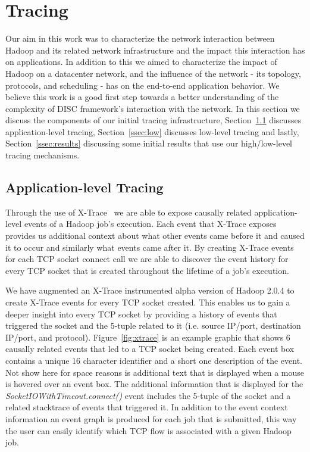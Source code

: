 \section{Tracing}
\label{sec:tracing}
Our aim in this work was to characterize the network interaction 
between Hadoop and its related network infrastructure and the impact this 
interaction has on applications. In addition to this we aimed to 
characterize the impact of Hadoop on a datacenter network, and the 
influence of the network - its topology, protocols, and scheduling - has on the 
end-to-end application behavior. We believe this work is a good first step 
towards a better understanding of the complexity of DISC framework's interaction
with the network. In this section we discuss the components of our initial tracing
infrastructure, Section~\ref{ssec:app} discusses application-level tracing, 
Section~\ref{ssec:low} discusses low-level tracing and lastly, 
Section~\ref{ssec:results} discussing some initial results that use our high/low-level
tracing mechanisms.

\subsection{Application-level Tracing}
\label{ssec:app}
Through the use of X-Trace~\cite{xtrace} we are able to expose causally related 
application-level events of a Hadoop job's execution. Each event that X-Trace
exposes provides us additional context about what other events came before it and
caused it to occur and similarly what events came after it. By creating X-Trace 
events for each TCP socket connect call we are able to discover the event history
for every TCP socket that is created throughout the lifetime of a job's execution.

We have augmented an X-Trace instrumented alpha version of Hadoop 2.0.4 to create 
X-Trace events for every TCP socket created. This enables us to gain a deeper insight
into every TCP socket by providing a history of events that triggered the socket and
the 5-tuple related to it (i.e. source IP/port, destination IP/port, and protocol).
Figure~\ref{fig:xtrace} is an example graphic that shows 6 causally related events that
led to a TCP socket being created. Each event box contains a unique 16 character 
identifier and a short one description of the event. Not show here for space reasons is
additional text that is displayed when a mouse is hovered over an event box. The additional
information that is displayed for the {\em SocketIOWithTimeout.connect()} event includes
the 5-tuple of the socket and a related stacktrace of events that triggered it. In addition
to the event context information an event graph is produced for each job that is submitted,
this way the user can easily identify which TCP flow is associated with a given Hadoop job.

